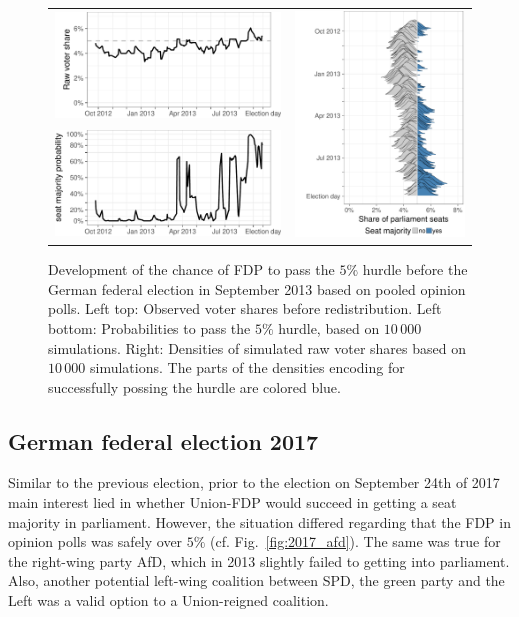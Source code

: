 \documentclass[smallcondensed]{svjour3}     %
\begin{document}
\begin{figure}[H]\centering
\begin{tabular}{ll}
\includegraphics[height=.15\textwidth]{figures/2013_pooled_fdp_rawShares.pdf}
&
\multirow{2}{*}[13ex]{\includegraphics[height=30ex]{figures/2013_pooled_fdp_ridgeline.pdf}}
\\
\includegraphics[height=.15\textwidth]{figures/2013_pooled_fdp_passingProb.pdf}
\end{tabular}
\caption{Development of the chance of FDP to pass the $5\%$ hurdle before the German federal election in September 2013 based on pooled opinion polls.
Left top: Observed voter shares before redistribution. Left bottom: Probabilities to pass the $5\%$ hurdle, based on $10\,000$ simulations. Right: Densities of simulated raw voter shares based on $10\,000$ simulations. The parts of the densities encoding for successfully possing the hurdle are colored blue.
\label{fig:2013_fdp}
}
\end{figure}





\subsection{German federal election 2017} \label{subsec:2017}
Similar to the previous election, prior to the election on
September 24th of 2017 main interest lied in whether Union-FDP
would succeed in getting a seat majority in parliament.
However, the situation differed regarding that the FDP in opinion
polls was safely over $5\%$ (cf. Fig.~\ref{fig:2017_afd}).
The same was true for the right-wing party AfD, which in 2013
slightly failed to getting into parliament. Also, another potential
left-wing coalition between SPD, the green party and the Left
was a valid option to a Union-reigned coalition.
\end{document}

